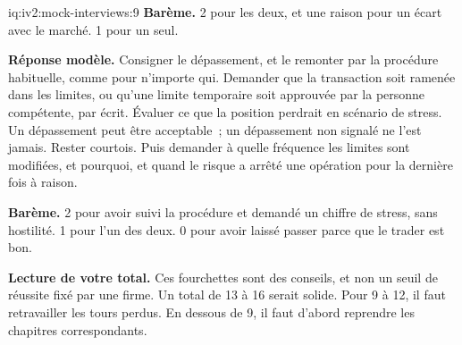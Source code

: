 \begin{solution}{iq:iv2:mock-interviews:9}
\textbf{Barème.} 2 pour les deux, et une raison pour un écart avec le marché. 1 pour un seul.

\ivstop
\textbf{Réponse modèle.} Consigner le dépassement, et le remonter par la procédure habituelle, comme pour n'importe qui. Demander que la transaction soit ramenée dans les limites, ou qu'une limite temporaire soit approuvée par la personne compétente, par écrit. Évaluer ce que la position perdrait en scénario de stress. Un dépassement peut être acceptable~; un dépassement non signalé ne l'est jamais. Rester courtois. Puis demander à quelle fréquence les limites sont modifiées, et pourquoi, et quand le risque a arrêté une opération pour la dernière fois à raison.

\textbf{Barème.} 2 pour avoir suivi la procédure et demandé un chiffre de stress, sans hostilité. 1 pour l'un des deux. 0 pour avoir laissé passer parce que le trader est bon.

\medskip
\textbf{Lecture de votre total.} Ces fourchettes sont des conseils, et non un seuil de réussite fixé par une firme. Un total de 13 à 16 serait solide. Pour 9 à 12, il faut retravailler les tours perdus. En dessous de 9, il faut d'abord reprendre les chapitres correspondants.

\end{solution}

